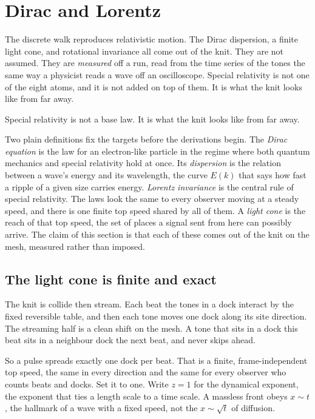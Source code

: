 \section{Dirac and Lorentz}

The discrete walk reproduces relativistic motion. The Dirac dispersion, a finite light cone, and rotational
invariance all come out of the knit. They are not assumed. They are \emph{measured} off a run, read from the time
series of the tones the same way a physicist reads a wave off an oscilloscope. Special relativity is not one of the
eight atoms, and it is not added on top of them. It is what the knit looks like from far away.

\begin{principle}
Special relativity is not a base law. It is what the knit looks like from far away.
\end{principle}

Two plain definitions fix the targets before the derivations begin. The \emph{Dirac equation} is the law for an
electron-like particle in the regime where both quantum mechanics and special relativity hold at once. Its
\emph{dispersion} is the relation between a wave's energy and its wavelength, the curve $E(k)$ that says how fast a
ripple of a given size carries energy. \emph{Lorentz invariance} is the central rule of special relativity. The
laws look the same to every observer moving at a steady speed, and there is one finite top speed shared by all of
them. A \emph{light cone} is the reach of that top speed, the set of places a signal sent from here can possibly
arrive. The claim of this section is that each of these comes out of the knit on the mesh, measured rather than
imposed.

\subsection{The light cone is finite and exact}

The knit is collide then stream. Each beat the tones in a dock interact by the fixed reversible table, and then
each tone moves one dock along its site direction. The streaming half is a clean shift on the mesh. A tone that
sits in a dock this beat sits in a neighbour dock the next beat, and never skips ahead.

So a pulse spreads exactly one dock per beat. That is a finite, frame-independent top speed, the same in every
direction and the same for every observer who counts beats and docks. Set it to one. Write $z = 1$ for the
dynamical exponent, the exponent that ties a length scale to a time scale. A massless front obeys $x \sim t$, the
hallmark of a wave with a fixed speed, not the $x \sim \sqrt{t}$ of diffusion.

